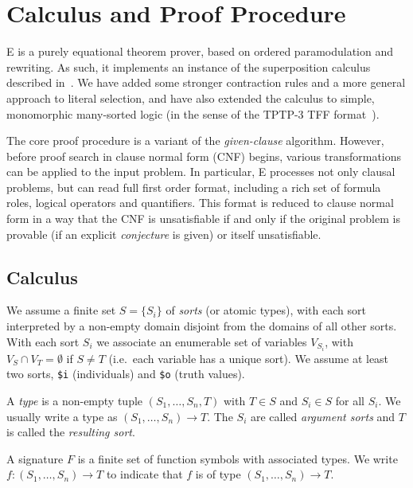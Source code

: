 \documentclass{report}
\begin{document}
\chapter{Calculus and Proof Procedure}
\label{sec:calculus}

E is a purely equational theorem prover, based on ordered
paramodulation and rewriting. As such, it implements an instance of
the superposition calculus described in~\cite{BG94}. We have added
some stronger contraction rules and a more general approach to literal
selection, and have also extended the calculus to simple, monomorphic
many-sorted logic (in the sense of the TPTP-3 TFF
format~\cite{SSCB:LPAR-2012}).

The core proof procedure is a variant of the \emph{given-clause}
algorithm. However, before proof search in clause normal form (CNF)
begins, various transformations can be applied to the input
problem. In particular, E processes not only clausal problems, but can
read full first order format, including a rich set of formula roles,
logical operators and quantifiers. This format is reduced to clause
normal form in a way that the CNF is unsatisfiable if and only if the
original problem is provable (if an explicit \emph{conjecture} is
given) or itself unsatisfiable.


\section{Calculus}

We assume a finite set $S=\{S_i\}$ of \emph{sorts}
(or atomic types), with each sort interpreted by a non-empty domain
disjoint from the domains of all other sorts. With each sort $S_i$ we
associate an enumerable set of variables $V_{S_i}$, with
$V_S\cap V_T = \emptyset$ if $S\not=T$ (i.e.\ each variable has a
unique sort). We assume at least two sorts, \texttt{\$i} (individuals)
and \texttt{\$o} (truth values).

A \emph{type} is a non-empty tuple $(S_1, \ldots, S_n, T)$
with $T\in S$ and $S_i \in S$ for all $S_i$. We usually write a type
as $(S_1, \ldots, S_n) \to T$. The $S_i$ are called \emph{argument
  sorts} and $T$ is called the \emph{resulting sort}.

A signature $F$ is a finite set of function symbols with associated
types. We write $f:(S_1, \ldots, S_n)
 \to T$ to indicate that $f$ is
of type $(S_1, \ldots, S_n) \to T$.
\end{document}
